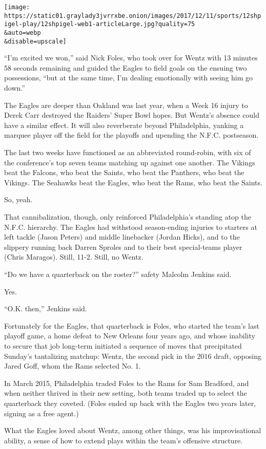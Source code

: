 \texttt{[image: https://static01.graylady3jvrrxbe.onion/images/2017/12/11/sports/12shpigel-play/12shpigel-web1-articleLarge.jpg?quality=75\\\&auto=webp\\\&disable=upscale]}

``I'm excited we won,'' said Nick Foles, who took over for Wentz with 13
minutes 58 seconds remaining and guided the Eagles to field goals on the
ensuing two possessions, ``but at the same time, I'm dealing emotionally
with seeing him go down.''

The Eagles are deeper than Oakland was last year, when a Week 16 injury
to Derek Carr destroyed the Raiders' Super Bowl hopes. But Wentz's
absence could have a similar effect. It will also reverberate beyond
Philadelphia, yanking a marquee player off the field for the playoffs
and upending the N.F.C. postseason.

The last two weeks have functioned as an abbreviated round-robin, with
six of the conference's top seven teams matching up against one another.
The Vikings beat the Falcons, who beat the Saints, who beat the
Panthers, who beat the Vikings. The Seahawks beat the Eagles, who beat
the Rams, who beat the Saints.

So, yeah.

That cannibalization, though, only reinforced Philadelphia's standing
atop the N.F.C. hierarchy. The Eagles had withstood season-ending
injuries to starters at left tackle (Jason Peters) and middle linebacker
(Jordan Hicks), and to the slippery running back Darren Sproles and to
their best special-teams player (Chris Maragos). Still, 11-2. Still, no
Wentz.

``Do we have a quarterback on the roster?'' safety Malcolm Jenkins said.

Yes.

``O.K. then,'' Jenkins said.

Fortunately for the Eagles, that quarterback is Foles, who started the
team's last playoff game, a home defeat to New Orleans four years ago,
and whose inability to secure that job long-term initiated a sequence of
moves that precipitated Sunday's tantalizing matchup: Wentz, the second
pick in the 2016 draft, opposing Jared Goff, whom the Rams selected No.
1.

In March 2015, Philadelphia traded Foles to the Rams for Sam Bradford,
and when neither thrived in their new setting, both teams traded up to
select the quarterback they coveted. (Foles ended up back with the
Eagles two years later, signing as a free agent.)

What the Eagles loved about Wentz, among other things, was his
improvisational ability, a sense of how to extend plays within the
team's offensive structure.

